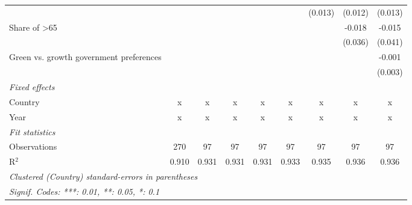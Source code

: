 \begin{table}[htbp]
\begin{tabular}{lcccccccc}
                                              &         &         &         &         &         & (0.013) & (0.012)       & (0.013)\\   
      Share of >65                            &         &         &         &         &         &         & -0.018        & -0.015\\   
                                              &         &         &         &         &         &         & (0.036)       & (0.041)\\   
      Green vs. growth government preferences &         &         &         &         &         &         &               & -0.001\\   
                                              &         &         &         &         &         &         &               & (0.003)\\   
      \emph{Fixed effects}\\
      Country                                 & x       & x       & x       & x       & x       & x       & x             & x\\  
      Year                                    & x       & x       & x       & x       & x       & x       & x             & x\\  
      \midrule \emph{Fit statistics}\\
      Observations                            & 270     & 97      & 97      & 97      & 97      & 97      & 97            & 97\\  
      R$^2$                                   & 0.910   & 0.931   & 0.931   & 0.931   & 0.933   & 0.935   & 0.936         & 0.936\\  
      \midrule
      \multicolumn{9}{l}{\emph{Clustered (Country) standard-errors in parentheses}}\\
      \multicolumn{9}{l}{\emph{Signif. Codes: ***: 0.01, **: 0.05, *: 0.1}}\\
   \end{tabular}
\end{table}



